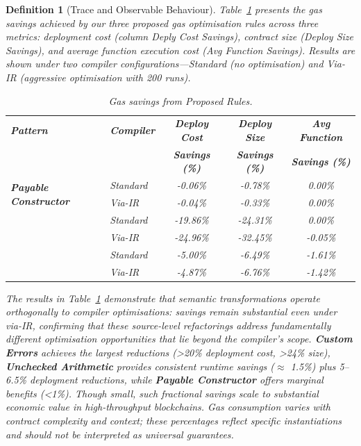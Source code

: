 \documentclass[manuscript,screen,review]{acmart}
\newtheorem{definition}{Definition}
\begin{document}
\begin{definition}[Trace and Observable Behaviour]
Table~\ref{tab:compiler-vs-refactoring} presents the gas savings achieved by our three proposed gas optimisation rules across three metrics: deployment cost (column Deply Cost Savings), contract size (Deploy Size Savings), and average function execution cost (Avg Function Savings). Results are shown under two compiler configurations---Standard (no optimisation) and Via-IR (aggressive optimisation with 200 runs).

\begin{table}[htb]
\centering
\caption{Gas savings from Proposed Rules.}
\label{tab:compiler-vs-refactoring}
\begin{tabular}{@{}llccc@{}}
\toprule
\textbf{Pattern} & \textbf{Compiler} & \textbf{Deploy Cost} & \textbf{Deploy Size} & \textbf{Avg Function} \\
 & & \textbf{Savings (\%)} & \textbf{Savings (\%)} & \textbf{Savings (\%)} \\ \midrule
\multirow{2}{*}{\textbf{Payable Constructor}}
 & Standard & -0.06\% & -0.78\% & 0.00\% \\
 & Via-IR & -0.04\% & -0.33\% & 0.00\% \\
\addlinespace
\multirow{2}{*}{\textbf{Custom Errors}}
 & Standard & -19.86\% & -24.31\% & 0.00\% \\
 & Via-IR & -24.96\% & -32.45\% & -0.05\% \\
\addlinespace
\multirow{2}{*}{\textbf{Unchecked Arithmetic}}
 & Standard & -5.00\% & -6.49\% & -1.61\% \\
 & Via-IR & -4.87\% & -6.76\% & -1.42\% \\
\bottomrule
\end{tabular}
\end{table}
The results in Table~\ref{tab:compiler-vs-refactoring} demonstrate that semantic transformations operate orthogonally to compiler optimisations: savings remain substantial even under \textit{via-IR}, confirming that these source-level refactorings address fundamentally different optimisation opportunities that lie beyond the compiler's scope. \textbf{Custom Errors} achieves the largest reductions (>20\% deployment cost, >24\% size), \textbf{Unchecked Arithmetic} provides consistent runtime savings ($\approx$ 1.5\%) plus 5--6.5\% deployment reductions, while \textbf{Payable Constructor} offers marginal benefits (<1\%). Though small, such fractional savings scale to substantial economic value in high-throughput blockchains. Gas consumption varies with contract complexity and context; these percentages reflect specific instantiations and should not be interpreted as universal guarantees.


\end{definition}
\end{document}
